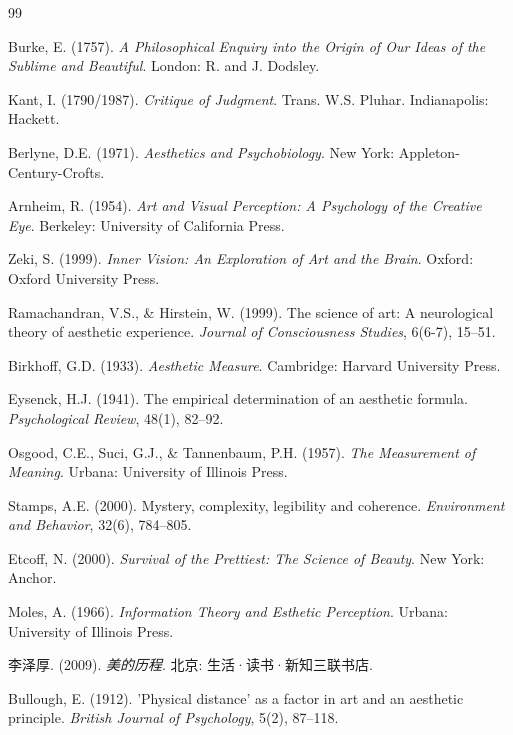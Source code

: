 \documentclass[10pt,a4paper]{article}
\begin{document}

\begin{thebibliography}{99}

 Burke, E. (1757). \textit{A Philosophical Enquiry into the Origin of Our Ideas of the Sublime and Beautiful}. London: R. and J. Dodsley.

 Kant, I. (1790/1987). \textit{Critique of Judgment}. Trans. W.S. Pluhar. Indianapolis: Hackett.

 Berlyne, D.E. (1971). \textit{Aesthetics and Psychobiology}. New York: Appleton-Century-Crofts.

 Arnheim, R. (1954). \textit{Art and Visual Perception: A Psychology of the Creative Eye}. Berkeley: University of California Press.

 Zeki, S. (1999). \textit{Inner Vision: An Exploration of Art and the Brain}. Oxford: Oxford University Press.

 Ramachandran, V.S., \& Hirstein, W. (1999). The science of art: A neurological theory of aesthetic experience. \textit{Journal of Consciousness Studies}, 6(6-7), 15--51.

 Birkhoff, G.D. (1933). \textit{Aesthetic Measure}. Cambridge: Harvard University Press.

 Eysenck, H.J. (1941). The empirical determination of an aesthetic formula. \textit{Psychological Review}, 48(1), 82--92.

 Osgood, C.E., Suci, G.J., \& Tannenbaum, P.H. (1957). \textit{The Measurement of Meaning}. Urbana: University of Illinois Press.

 Stamps, A.E. (2000). Mystery, complexity, legibility and coherence. \textit{Environment and Behavior}, 32(6), 784--805.

 Etcoff, N. (2000). \textit{Survival of the Prettiest: The Science of Beauty}. New York: Anchor.

 Moles, A. (1966). \textit{Information Theory and Esthetic Perception}. Urbana: University of Illinois Press.

 李泽厚. (2009). \textit{美的历程}. 北京: 生活·读书·新知三联书店.

 Bullough, E. (1912). 'Physical distance' as a factor in art and an aesthetic principle. \textit{British Journal of Psychology}, 5(2), 87--118.


\end{thebibliography}
\end{document}
